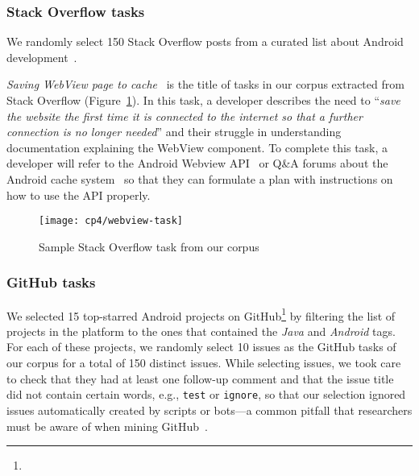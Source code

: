 \subsubsection{Stack Overflow tasks}

We randomly select 150 Stack Overflow posts from a curated list about Android development~\cite{baltes2019-rep}.

\textit{Saving WebView page to cache}~\cite{so18607655}
is the title of tasks in our corpus extracted from Stack Overflow (Figure~\ref{fig:webview-task}). In this task, a developer describes the need
to
``\textit{save the website the first time it is connected to the internet so that a further connection is no longer needed}''
and their struggle in understanding documentation explaining the WebView component.
To complete this task, a developer will refer to the Android Webview API~\cite{apiWebView}
or Q\&A forums about the Android cache system~\cite{so8410830} so that they can 
formulate a plan with instructions on how to use the API properly.

\begin{figure}
    \centering
    \texttt{[image: cp4/webview-task]}
    \caption{Sample Stack Overflow task from our corpus}
    \label{fig:webview-task}
\end{figure}

\subsubsection{GitHub tasks}


We selected 15 top-starred Android projects on GitHub\footnote{} by filtering the list of projects in the platform to the ones that contained the \textit{Java} and \textit{Android} tags.
For each of these projects, we randomly select 10 issues as the GitHub tasks of our corpus for a total of 150 distinct issues.
While selecting issues, we took care to check that they had at least one follow-up comment and that the issue title did not contain certain words, e.g., {\small \texttt{test}} or {\small  \texttt{ignore}},
so that our selection ignored issues automatically created by scripts or bots---a common pitfall that researchers must be aware of when mining GitHub~\cite{kalliamvakou2014}.



